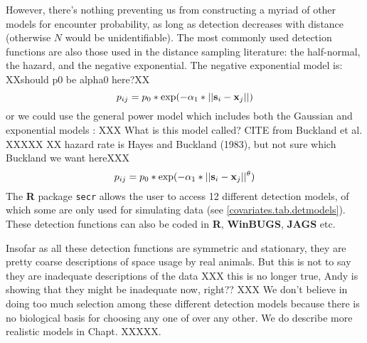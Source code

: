 However, there's nothing preventing us from constructing a myriad of
other models for encounter probability, as long as detection decreases with distance (otherwise $N$ would be unidentifiable). The most commonly used detection
functions are also those used in the distance sampling literature: the
half-normal, the hazard, and the negative exponential.
The negative exponential model is: XXshould p0 be alpha0 here?XX
\[
p_{ij} = p_{0}*\exp(-\alpha_{1} *||{\bf s}_{i}-{\bf x}_{j}||)
\]
or we could use the general power model which includes both the
Gaussian and exponential models \citep{russell_etal:2012}: XXX What is
this model called? CITE from Buckland et al. XXXXX
XX hazard rate is Hayes and Buckland (1983), but not sure which Buckland we want hereXXX
\[
p_{ij} = p_{0}*\exp(-\alpha_{1} *||{\bf s}_{i}-{\bf x}_{j}||^{\theta} )
\]
The {\bf R} package
{\tt secr} allows the user to access 12 different detection models, of which
some are only used for simulating data (see \ref{covariates.tab.detmodels}). These detection
functions can  also be coded in {\bf R}, {\bf WinBUGS},
{\bf JAGS} etc.

Insofar as all these detection functions are symmetric and stationary, they are pretty
coarse descriptions of space usage by real animals. But this is not to
say they are inadequate descriptions of the data XXX this is no longer true, Andy
is showing that they might be inadequate now, right?? XXX
We don't believe in doing too much
selection among these different detection models because there is no biological basis for
choosing any one of over any other. We do describe more
realistic models in Chapt. XXXXX.



